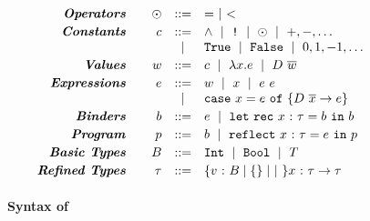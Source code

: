 \begin{figure}[t!]
\centering
$$
\begin{array}{rrcl}
\emphbf{Operators} \quad
  & \odot
  & ::= & = \spmid  <
\\[0.03in]

\emphbf{Constants} \quad
  & c
  & ::=
  & \land \spmid \lnot \spmid \odot \spmid +,-,\dots  \\
  && \spmid & \etrue\spmid \efalse \spmid 0, 1,-1, \dots
\\[0.03in]

\emphbf{Values} \quad
  & w & ::=&  c
             \spmid \efun{x}{\typ}{e} \spmid D\ \overline{w}
\\[0.03in]

\emphbf{Expressions} \quad
  & e & ::=    & w \spmid x \spmid \eapp{e}{e}      \\
  &   & \spmid & \ecase{x}{e}{\dc}{\overline{x}}{e}
\\[0.03in]

\emphbf{Binders} \quad
  & \bd & ::= & e \spmid \eletb{x}{\gtyp}{\bd}{\bd}
\\[0.03in]

\emphbf{Program} \quad
  & \prog & ::= & \bd \spmid \erefb{x}{\gtyp}{e}{\prog}
\\[0.03in]


\emphbf{Basic Types} \quad
  & \btyp
  & ::=
  & \tint \spmid \tbool \spmid T
\\[0.03in]

\emphbf{Refined Types} \quad
  & \typ
  & ::=      & \tref{v}{\btyp}{\reft} \spmid \tfun{x}{\typ}{\typ}
\\[0.05in]
\end{array}
$$
\caption{\textbf{Syntax of \corelan}}
\label{fig:appendix:syntax}
\end{figure}

